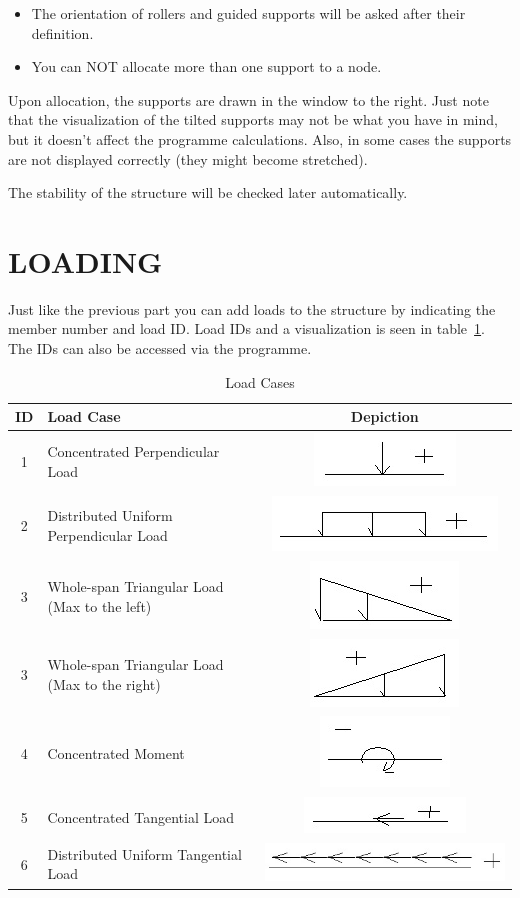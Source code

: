 \documentclass{article}
\begin{document}
\begin{itemize}
\item The orientation of rollers and guided supports will be asked after their definition.
\item You can NOT allocate more than one support to a node.
\end{itemize}
Upon allocation, the supports are drawn in the window to the right. Just note that the visualization of the tilted supports may not be what you have in mind, but it doesn’t affect the programme calculations. Also, in some cases the supports are not displayed correctly (they might become stretched).

	The stability of the structure will be checked later automatically.
\section{LOADING}
Just like the previous part you can add loads to the structure by indicating the member number and load ID. Load IDs and a visualization is seen in table~\ref{tbl2}. The IDs can also be accessed via the programme.
\begin{table}
\centering
\caption{Load Cases}
\label{tbl2}
\begin{tabular}{|c|l|c|}
\hline ID & Load Case & Depiction\\
\hline 1 &Concentrated Perpendicular Load& \includegraphics[height=.5cm]{cpl.jpg}\\
\hline 2 &Distributed Uniform Perpendicular Load & \includegraphics[height=.5cm]{dupl.jpg}\\
\hline 3 & Whole-span Triangular Load (Max to the left) &  \includegraphics[height=.5cm]{wtll.jpg}\\
\hline 3 &Whole-span Triangular Load (Max to the right) & \includegraphics[height=.5cm]{wtlr.jpg}\\
\hline 4 &Concentrated Moment & \includegraphics[height=.6cm]{cm.jpg}\\
\hline 5 & Concentrated Tangential Load & \includegraphics[height=.5cm]{ctl.jpg}\\
\hline 6 &Distributed Uniform Tangential Load & \includegraphics[height=.6cm]{dutl.jpg}\\
\hline
\end{tabular}
\end{table}
\end{document}

